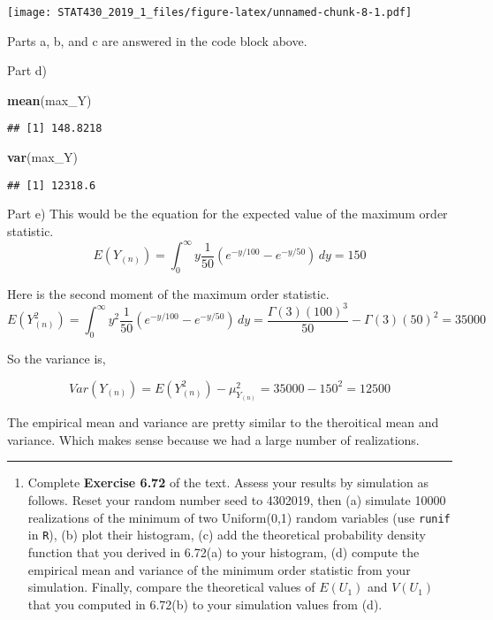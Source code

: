 \documentclass[]{article}
\newenvironment{Shaded}{\begin{snugshade}}{\end{snugshade}}
\newcommand{\KeywordTok}[1]{\textcolor[rgb]{0.13,0.29,0.53}{\textbf{#1}}}
\newcommand{\NormalTok}[1]{#1}
\providecommand{\tightlist}{%
  \setlength{\itemsep}{0pt}\setlength{\parskip}{0pt}}
\begin{document}
\texttt{[image: STAT430\_2019\_1\_files/figure-latex/unnamed-chunk-8-1.pdf]}

Parts a, b, and c are answered in the code block above.

Part d)

\begin{Shaded}
\begin{Highlighting}[]
\KeywordTok{mean}\NormalTok{(max_Y)}
\end{Highlighting}
\end{Shaded}

\begin{verbatim}
## [1] 148.8218
\end{verbatim}

\begin{Shaded}
\begin{Highlighting}[]
\KeywordTok{var}\NormalTok{(max_Y)}
\end{Highlighting}
\end{Shaded}

\begin{verbatim}
## [1] 12318.6
\end{verbatim}

Part e) This would be the equation for the expected value of the maximum
order statistic. \[
E(Y_{(n)})=\int_0^\infty y\frac{1}{50}(e^{-y/100} - e^{-y/50})\,dy = 150
\]

Here is the second moment of the maximum order statistic. \[
E(Y^2_{(n)})=\int_0^\infty y^2\frac{1}{50}(e^{-y/100} - e^{-y/50})\,dy = \frac{\Gamma(3)(100)^3}{50} - \Gamma(3)(50)^2 = 35000
\]

So the variance is,

\[
Var(Y_{(n)}) = E(Y_{(n)}^2) - \mu_{Y_{(n)}}^2 = 35000 - 150^2 = 12500
\]

The empirical mean and variance are pretty similar to the theroitical
mean and variance. Which makes sense because we had a large number of
realizations.

\begin{center}\rule{0.5\linewidth}{\linethickness}\end{center}

\begin{enumerate}
\def\labelenumi{\arabic{enumi}.}
\setcounter{enumi}{1}
\tightlist
\item
  Complete \textbf{Exercise 6.72} of the text. Assess your results by
  simulation as follows. Reset your random number seed to 4302019, then
  (a) simulate 10000 realizations of the minimum of two Uniform(0,1)
  random variables (use \texttt{runif} in \texttt{R}), (b) plot their
  histogram, (c) add the theoretical probability density function that
  you derived in 6.72(a) to your histogram, (d) compute the empirical
  mean and variance of the minimum order statistic from your simulation.
  Finally, compare the theoretical values of \(E(U_1)\) and \(V(U_1)\)
  that you computed in 6.72(b) to your simulation values from (d).
\end{enumerate}
\end{document}
